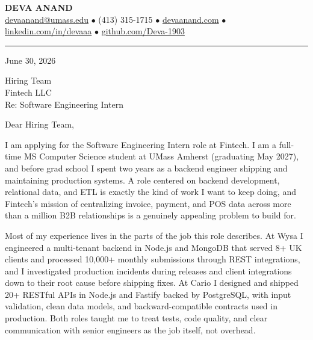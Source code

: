 \documentclass[letterpaper,11pt]{article}
\begin{document}
\begin{center}
    {\fontsize{18}{20}\selectfont\bfseries DEVA ANAND}\\ \vspace{3pt}
    {\small
    \href{mailto:devaanand@umass.edu}{devaanand@umass.edu}
    \enspace$\bullet$\enspace
    (413) 315-1715
    \enspace$\bullet$\enspace
    \href{https://devaanand.com}{devaanand.com}
    \enspace$\bullet$\enspace
    \href{https://linkedin.com/in/devaaa/}{linkedin.com/in/devaaa}
    \enspace$\bullet$\enspace
    \href{https://github.com/Deva-1903}{github.com/Deva-1903}}
\end{center}
\vspace{6pt}
\hrule
\vspace{10pt}

\noindent June 30, 2026

\vspace{4pt}

\noindent Hiring Team\\
Fintech LLC\\
Re: Software Engineering Intern

\vspace{6pt}

\noindent Dear Hiring Team,

I am applying for the Software Engineering Intern role at Fintech. I am a full-time MS Computer Science student at UMass Amherst (graduating May 2027), and before grad school I spent two years as a backend engineer shipping and maintaining production systems. A role centered on backend development, relational data, and ETL is exactly the kind of work I want to keep doing, and Fintech's mission of centralizing invoice, payment, and POS data across more than a million B2B relationships is a genuinely appealing problem to build for.

Most of my experience lives in the parts of the job this role describes. At Wysa I engineered a multi-tenant backend in Node.js and MongoDB that served 8+ UK clients and processed 10,000+ monthly submissions through REST integrations, and I investigated production incidents during releases and client integrations down to their root cause before shipping fixes. At Cario I designed and shipped 20+ RESTful APIs in Node.js and Fastify backed by PostgreSQL, with input validation, clean data models, and backward-compatible contracts used in production. Both roles taught me to treat tests, code quality, and clear communication with senior engineers as the job itself, not overhead.
\end{document}
